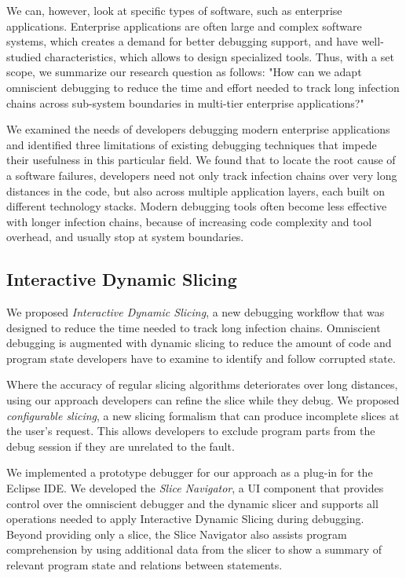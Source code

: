 We can, however, look at specific types of software, such as enterprise applications.
Enterprise applications are often large and complex software systems, which creates a demand for better debugging support, and have well-studied characteristics, which allows to design specialized tools.
Thus, with a set scope, we summarize our research question as follows:
"How can we adapt omniscient debugging to reduce the time and effort needed to track long infection chains across sub-system boundaries in multi-tier enterprise applications?"


We examined the needs of developers debugging modern enterprise applications and identified three limitations of existing debugging techniques that impede their usefulness in this particular field.
We found that to locate the root cause of a software failures, developers need not only track infection chains over very long distances in the code, but also across multiple application layers, each built on different technology stacks.
Modern debugging tools often become less effective with longer infection chains, because of increasing code complexity and tool overhead, and usually stop at system boundaries.

\subsection{Interactive Dynamic Slicing}

We proposed \emph{Interactive Dynamic Slicing}, a new debugging workflow that was designed to reduce the time needed to track long infection chains.
Omniscient debugging is augmented with dynamic slicing to reduce the amount of code and program state developers have to examine to identify and follow corrupted state.

Where the accuracy of regular slicing algorithms deteriorates over long distances, using our approach developers can refine the slice while they debug.
We proposed \emph{configurable slicing}, a new slicing formalism that can produce incomplete slices at the user's request.
This allows developers to exclude program parts from the debug session if they are unrelated to the fault.

We implemented a prototype debugger for our approach as a plug-in for the Eclipse IDE.
We developed the \emph{Slice Navigator}, a UI component that provides control over the omniscient debugger and the dynamic slicer and supports all operations needed to apply Interactive Dynamic Slicing during debugging.
Beyond providing only a slice, the Slice Navigator also assists program comprehension by using additional data from the slicer to show a summary of relevant program state and relations between statements.

